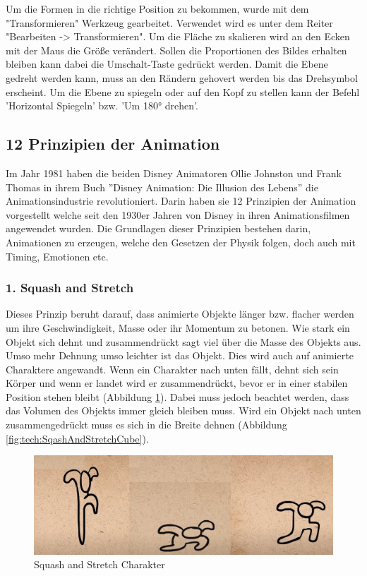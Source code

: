 Um die Formen in die richtige Position zu bekommen, wurde mit dem "Transformieren" Werkzeug
gearbeitet. Verwendet wird es unter dem Reiter "Bearbeiten -> Transformieren". 
Um die Fläche zu skalieren wird an den Ecken mit der Maus die Größe verändert. Sollen die Proportionen des Bildes erhalten bleiben
kann dabei die Umschalt-Taste gedrückt werden. Damit die Ebene gedreht werden kann, muss an den Rändern gehovert werden bis das Drehsymbol erscheint. 
Um die Ebene zu spiegeln oder auf den Kopf zu stellen kann der Befehl 'Horizontal Spiegeln' bzw. 'Um 180° drehen'.

\subsection{12 Prinzipien der Animation}
Im Jahr 1981 haben die beiden Disney Animatoren Ollie Johnston und Frank Thomas in ihrem Buch ''Disney Animation: Die Illusion des Lebens'' die Animationsindustrie revolutioniert. 
Darin haben sie 12 Prinzipien der Animation vorgestellt welche seit den 1930er Jahren von Disney in ihren Animationsfilmen angewendet wurden. 
Die Grundlagen dieser Prinzipien bestehen darin, Animationen zu erzeugen, welche den Gesetzen der Physik folgen, doch auch mit Timing, Emotionen etc. 

\subsubsection{1. Squash and Stretch}
Dieses Prinzip beruht darauf, dass animierte Objekte länger bzw. flacher werden um ihre Geschwindigkeit, Masse oder ihr Momentum zu betonen.
Wie stark ein Objekt sich dehnt und zusammendrückt sagt viel über die Masse des Objekts aus. Umso mehr Dehnung umso leichter ist das Objekt. 
Dies wird auch auf animierte Charaktere angewandt. Wenn ein Charakter nach unten fällt, dehnt sich sein Körper und wenn er landet wird er zusammendrückt, bevor er in einer stabilen Position stehen bleibt (Abbildung \ref{fig:tech:SqashAndStretch}).    
Dabei muss jedoch beachtet werden, dass das Volumen des Objekts immer gleich bleiben muss. Wird ein Objekt nach unten zusammengedrückt muss es sich in die Breite dehnen (Abbildung \ref{fig:tech:SqashAndStretchCube}). 
\begin{figure}[H]
    \centering
    \includegraphics[scale=0.5]{pics/SqashAndStretch.png}
    \caption{Squash and Stretch Charakter}
    \label{fig:tech:SqashAndStretch}
\end{figure}

